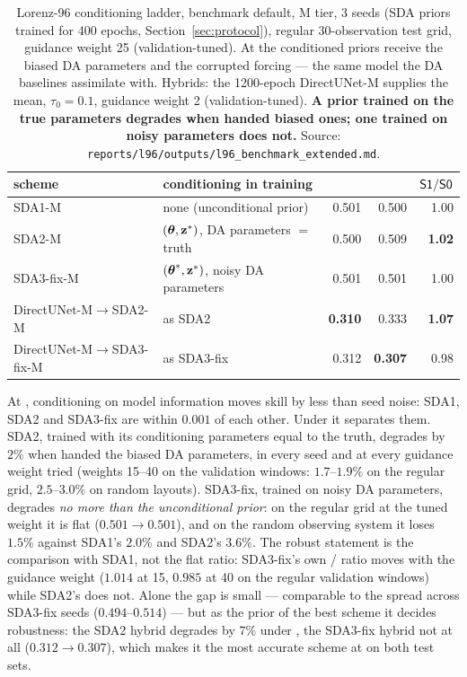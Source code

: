 \begin{table}[t]
\centering
\small
\begin{tabular}{@{}llrrr@{}}
\toprule
\textbf{scheme} & \textbf{conditioning in training} & \textbf{\Sz{}} & \textbf{\So{}} & $\textsf{S1}/\textsf{S0}$ \\
\midrule
SDA1-M & none (unconditional prior) & 0.501 & 0.500 & 1.00 \\
SDA2-M & $(\boldsymbol{\theta},\mathbf{z}^{*})$, DA parameters $=$ truth & 0.500 & 0.509 & \textbf{1.02} \\
SDA3-fix-M & $(\boldsymbol{\theta}^{*},\mathbf{z}^{*})$, noisy DA parameters & 0.501 & 0.501 & 1.00 \\
\addlinespace
DirectUNet-M$\to$SDA2-M & as SDA2 & \textbf{0.310} & 0.333 & \textbf{1.07} \\
DirectUNet-M$\to$SDA3-fix-M & as SDA3-fix & 0.312 & \textbf{0.307} & 0.98 \\
\bottomrule
\end{tabular}
\caption{Lorenz-96 conditioning ladder, benchmark default, M tier, 3 seeds (SDA
priors trained for 400 epochs, Section~\ref{sec:protocol}),
regular 30-observation test grid, guidance weight 25 (validation-tuned). At \So{}
the conditioned priors receive the biased DA parameters and the corrupted forcing
--- the same model the DA baselines assimilate with. Hybrids: the 1200-epoch
DirectUNet-M supplies the mean, $\tau_0 = 0.1$, guidance weight 2
(validation-tuned). \textbf{A prior trained on the true parameters degrades when
handed biased ones; one trained on noisy parameters does not.} Source:
\texttt{reports/l96/outputs/l96\_benchmark\_extended.md}.}
\label{tab:ladder}
\end{table}

At \Sz{}, conditioning on model information moves skill by less than seed noise:
SDA1, SDA2 and SDA3-fix are within $0.001$ of each other. Under \So{} it
separates them. SDA2, trained with its conditioning parameters equal to the
truth, degrades by $2\%$ when handed the biased DA parameters, in every seed and
at every guidance weight tried (weights 15--40 on the validation windows:
$1.7$--$1.9\%$ on the regular grid, $2.5$--$3.0\%$ on random layouts). SDA3-fix, trained on noisy
DA parameters, degrades \emph{no more than the unconditional prior}: on the
regular grid at the tuned weight it is flat ($0.501 \to 0.501$), and on the random
observing system it loses $1.5\%$ against SDA1's $2.0\%$ and SDA2's $3.6\%$. The
robust statement is the comparison with SDA1, not the flat ratio: SDA3-fix's own
\So/\Sz{} ratio moves with the guidance weight ($1.014$ at 15, $0.985$ at 40 on the
regular validation windows) while SDA2's does not. Alone the gap is small ---
comparable to the spread across SDA3-fix seeds ($0.494$--$0.514$) --- but as the
prior of the best scheme it decides robustness: the SDA2 hybrid degrades by $7\%$
under \So{}, the SDA3-fix hybrid not at all ($0.312 \to 0.307$), which makes it the
most accurate scheme at \So{} on both test sets.

